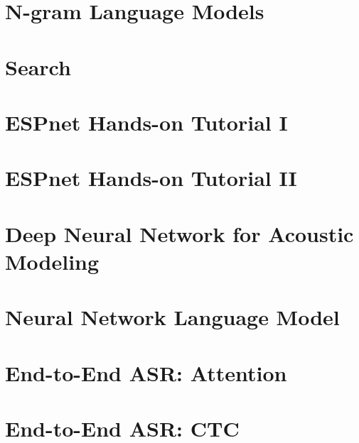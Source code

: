 \documentclass[a4paper]{article}
\begin{document}
\section{N-gram Language Models}


\section{Search}


\section{ESPnet Hands-on Tutorial I}


\section{ESPnet Hands-on Tutorial II}


\section{Deep Neural Network for Acoustic Modeling}


\section{Neural Network Language Model}


\section{End-to-End ASR: Attention}


\section{End-to-End ASR: CTC}

\end{document}
